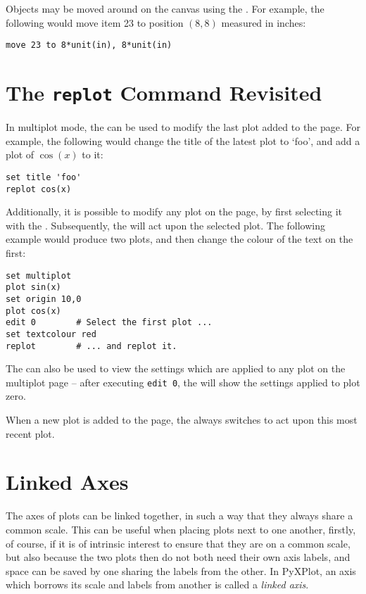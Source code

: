 Objects may be moved around on the canvas using the . For
example, the following would move item 23 to position $(8,8)$ measured in
inches:
\begin{verbatim}
move 23 to 8*unit(in), 8*unit(in)
\end{verbatim}

\section{The {\tt replot} Command Revisited}

In multiplot mode, the  can be used to modify the last plot
added to the page. For example, the following would change the title of the
latest plot to `foo', and add a plot of $\cos(x)$ to it:

\begin{verbatim}
set title 'foo'
replot cos(x)
\end{verbatim}

Additionally, it is possible to modify any plot on the page, by first selecting
it with the . Subsequently, the  will act upon
the selected plot. The following example would produce two plots, and then
change the colour of the text on the first:

\begin{verbatim}
set multiplot
plot sin(x)
set origin 10,0
plot cos(x)
edit 0        # Select the first plot ...
set textcolour red
replot        # ... and replot it.
\end{verbatim}

The  can also be used to view the settings which are applied to
any plot on the multiplot page -- after executing {\tt edit~0}, the
 will show the settings applied to plot zero.

When a new plot is added to the page, the  always switches to
act upon this most recent plot.

\section{Linked Axes}

The axes of plots can be linked together, in such a way that they always share
a common scale. This can be useful when placing plots next to one another,
firstly, of course, if it is of intrinsic interest to ensure that they are on a
common scale, but also because the two plots then do not both need their own
axis labels, and space can be saved by one sharing the labels from the other.
In PyXPlot, an axis which borrows its scale and labels from another is called a
{\it linked axis}.

